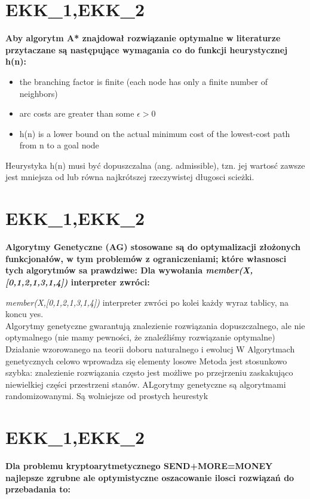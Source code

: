 \section{EKK\_1,EKK\_2}
\textbf{Aby algorytm A* znajdował rozwiązanie optymalne w literaturze przytaczane są następujące wymagania co do funkcji heurystycznej h(n):}
\vspace{0.4cm}

\begin{itemize}
\item the branching factor is finite (each node has only a finite number of neighbors)
\item arc costs are greater than some $\epsilon > 0$
\item h(n) is a lower bound on the actual minimum cost of the lowest-cost path from n to a goal node
\end{itemize}

\noindent Heurystyka h(n) musi być dopuszczalna (ang. admissible), tzn. jej wartosć zawsze jest mniejsza od lub równa najkrótszej rzeczywistej długosci scieżki.

\section{EKK\_1,EKK\_2}
\textbf{Algorytmy  Genetyczne  (AG)  stosowane  są  do  optymalizacji  złożonych  funkcjonałów,  w  tym  problemów  z  ograniczeniami;  które  własnosci  tych  algorytmów  sa  prawdziwe:   Dla  wywołania \textit{member(X,[0,1,2,1,3,1,4])} interpreter zwróci:}
\vspace{0.4cm}

\noindent \textit{member(X,[0,1,2,1,3,1,4])} interpreter zwróci po kolei każdy wyraz tablicy, na koncu yes.\\
Algorytmy genetyczne gwarantują znalezienie rozwiązania dopuszczalnego, ale nie optymalnego (nie mamy pewności, że znaleźliśmy rozwiązanie optymalne)
Działanie wzorowanego na teorii doboru naturalnego i ewolucj
W Algorytmach genetycznych celowo wprowadza się elementy losowe
Metoda jest stosunkowo szybka: znalezienie rozwiązania często jest możliwe po przejrzeniu zaskakująco niewielkiej części przestrzeni stanów.
ALgorytmy genetyczne są algorytmami randomizowanymi.
Są wolniejsze od prostych heurestyk

\section{EKK\_1,EKK\_2}
\textbf{Dla  problemu  kryptoarytmetycznego  SEND+MORE=MONEY  najlepsze  zgrubne  ale optymistyczne oszacowanie ilosci rozwiązań do przebadania to:}
\vspace{0.4cm}

